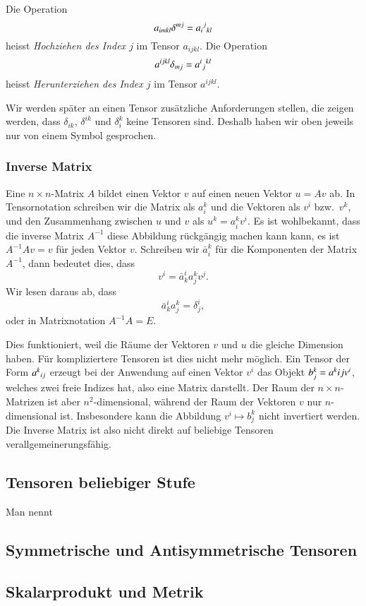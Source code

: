 \begin{definition}
Die Operation
\[
a_{imkl}\delta^{mj}=a_i\mathstrut^j\mathstrut_{kl}
\]
heisst {\em Hochziehen des Index $j$} im Tensor $a_{ijkl}$.
Die Operation
\[
a^{ijkl}\delta_{mj}=a^i\mathstrut_j\mathstrut^{kl}
\]
heisst {\em Herunterziehen des Index $j$} im Tensor $a^{ijkl}$.
\end{definition}

Wir werden später an einen Tensor zusätzliche Anforderungen stellen,
die zeigen werden, dass $\delta_{ik}$, $\delta^{ik}$ und $\delta_i^k$
keine Tensoren sind.
Deshalb haben wir oben jeweils nur von einem Symbol gesprochen.

\subsubsection{Inverse Matrix}
Eine $n\times n$-Matrix $A$ bildet einen Vektor $v$ auf einen
neuen Vektor $u=Av$ ab.
In Tensornotation schreiben wir die Matrix als $a_i^k$ und die Vektoren
als $v^i$ bzw.~$v^k$, und den Zusammenhang zwischen $u$ und $v$ als
$u^k=a_i^kv^i$.
Es ist wohlbekannt, dass die inverse Matrix $A^{-1}$ diese Abbildung
rückgängig machen kann kann, es ist $A^{-1}Av=v$ für jeden Vektor $v$.
Schreiben wir  $\bar a_i^k$ für die Komponenten der Matrix $A^{-1}$,
dann bedeutet dies, dass
\[
v^i = \bar a^i_ka_j^kv^j.
\]
Wir lesen daraus ab, dass
\[
\bar a_k^i a_j^k = \delta^i_j,
\]
oder in Matrixnotation $A^{-1}A=E$.

Dies funktioniert, weil die Räume der Vektoren $v$ und $u$ die gleiche
Dimension haben.
Für kompliziertere Tensoren ist dies nicht mehr möglich.
Ein Tensor der Form $a^k\mathstrut_{ij}$ erzeugt bei der Anwendung
auf einen Vektor $v^i$ das Objekt $b^k_j=a^k\mathstrut{ij}v^i$, welches
zwei freie Indizes hat, also eine Matrix darstellt.
Der Raum der $n\times n$-Matrizen ist aber $n^2$-dimensional, während
der Raum der Vektoren $v$ nur $n$-dimensional ist.
Insbesondere kann die Abbildung $v^i\mapsto b^k_j$ nicht invertiert
werden.
Die Inverse Matrix ist also nicht direkt auf beliebige Tensoren 
verallgemeinerungsfähig.

\subsection{Tensoren beliebiger Stufe}
Man nennt 

\subsection{Symmetrische und Antisymmetrische Tensoren}

\subsection{Skalarprodukt und Metrik}

